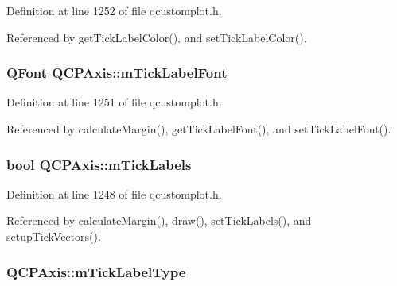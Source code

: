 Definition at line 1252 of file qcustomplot.\+h.



Referenced by get\+Tick\+Label\+Color(), and set\+Tick\+Label\+Color().

\hypertarget{class_q_c_p_axis_add79d1e39c4ed65869a1e9cc79043f3f}{}
\subsubsection[{m\+Tick\+Label\+Font}]{\setlength{\rightskip}{0pt plus 5cm}Q\+Font Q\+C\+P\+Axis\+::m\+Tick\+Label\+Font\hspace{0.3cm}{\ttfamily [protected]}}\label{class_q_c_p_axis_add79d1e39c4ed65869a1e9cc79043f3f}


Definition at line 1251 of file qcustomplot.\+h.



Referenced by calculate\+Margin(), get\+Tick\+Label\+Font(), and set\+Tick\+Label\+Font().

\hypertarget{class_q_c_p_axis_a3e4315be072026644e69009557a2fa11}{}
\subsubsection[{m\+Tick\+Labels}]{\setlength{\rightskip}{0pt plus 5cm}bool Q\+C\+P\+Axis\+::m\+Tick\+Labels\hspace{0.3cm}{\ttfamily [protected]}}\label{class_q_c_p_axis_a3e4315be072026644e69009557a2fa11}


Definition at line 1248 of file qcustomplot.\+h.



Referenced by calculate\+Margin(), draw(), set\+Tick\+Labels(), and setup\+Tick\+Vectors().

\hypertarget{class_q_c_p_axis_a6e056c1cb1aab0eddebfebbcb78c8f90}{}
\subsubsection[{m\+Tick\+Label\+Type}]{ Q\+C\+P\+Axis\+::m\+Tick\+Label\+Type\hspace{0.3cm}{\ttfamily [protected]}}\label{class_q_c_p_axis_a6e056c1cb1aab0eddebfebbcb78c8f90}


